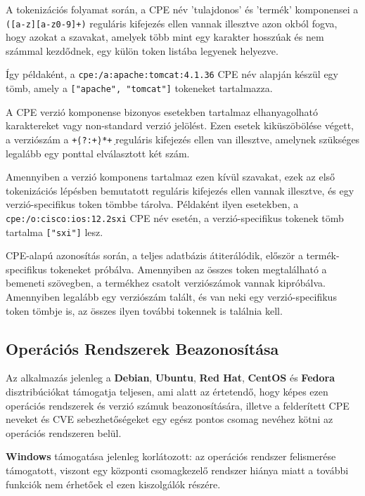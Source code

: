 	A tokenizációs folyamat során, a CPE név 'tulajdonos' és 'termék' komponensei a \texttt{([a-z][a-z0-9]+)} reguláris kifejezés ellen vannak illesztve azon okból fogva, hogy azokat a szavakat, amelyek több mint egy karakter hosszúak és nem számmal kezdődnek, egy külön token listába legyenek helyezve.
	
	Így példaként, a \texttt{cpe:/a:apache:tomcat:4.1.36} CPE név alapján készül egy tömb, amely a \texttt{["apache", "tomcat"]} tokeneket tartalmazza.
	
	A CPE verzió komponense bizonyos esetekben tartalmaz elhanyagolható karaktereket vagy non-standard verzió jelölést. Ezen esetek kiküszöbölése végett, a verziószám a \texttt{\d+\.(?:\d+\.)*\d+} reguláris kifejezés ellen van illesztve, amelynek szükséges legalább egy ponttal elválasztott két szám.
	
	Amennyiben a verzió komponens tartalmaz ezen kívül szavakat, ezek az első tokenizációs lépésben bemutatott reguláris kifejezés ellen vannak illesztve, és egy verzió-specifikus token tömbbe tárolva. Példaként ilyen esetekben, a \texttt{cpe:/o:cisco:ios:12.2sxi} CPE név esetén, a verzió-specifikus tokenek tömb tartalma \texttt{["sxi"]} lesz.
	
	CPE-alapú azonosítás során, a teljes adatbázis átiterálódik, először a termék-specifikus tokeneket próbálva. Amennyiben az összes token megtalálható a bemeneti szövegben, a termékhez csatolt verziószámok vannak kipróbálva. Amennyiben legalább egy verziószám talált, és van neki egy verzió-specifikus token tömbje is, az összes ilyen további tokennek is találnia kell.

\subsection*{Operációs Rendszerek Beazonosítása}

	Az alkalmazás jelenleg a \textbf{Debian}, \textbf{Ubuntu}, \textbf{Red Hat}, \textbf{CentOS} és \textbf{Fedora} disztribúciókat támogatja teljesen, ami alatt az értetendő, hogy képes ezen operációs rendszerek és verzió számuk beazonosítására, illetve a felderített CPE neveket és CVE sebezhetőségeket egy egész pontos csomag nevéhez kötni az operációs rendszeren belül.
	
	\textbf{Windows} támogatása jelenleg korlátozott: az operációs rendszer felismerése támogatott, viszont egy központi csomagkezelő rendszer hiánya miatt a további funkciók nem érhetőek el ezen kiszolgálók részére.
	
